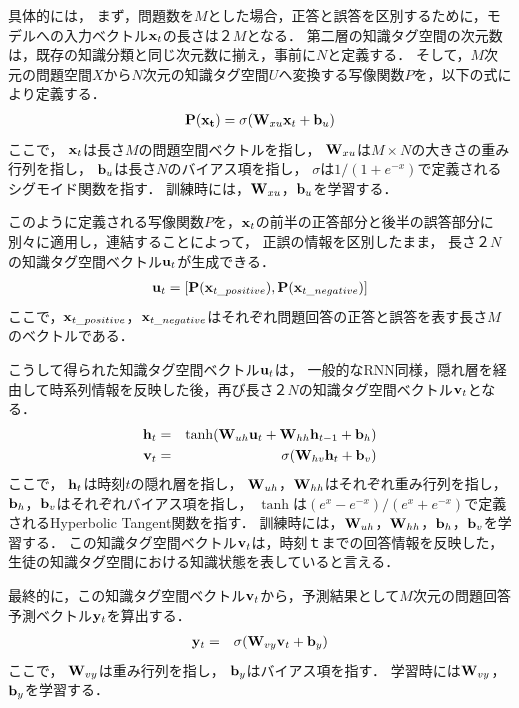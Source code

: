 具体的には，
まず，問題数を$M$とした場合，正答と誤答を区別するために，モデルへの入力ベクトル${\bf x}_t$の長さは$２M$となる．
第二層の知識タグ空間の次元数は，既存の知識分類と同じ次元数に揃え，事前に$N$と定義する．
そして，$M$次元の問題空間$X$から$N$次元の知識タグ空間$U$へ変換する写像関数$P$を，以下の式により定義する．
\begin{eqnarray}
{\bf P({\bf x}_t)} = \sigma( {\bf W}_{xu} {\bf x}_t + {\bf b}_u)
\end{eqnarray}
ここで，
${\bf x}_t$は長さ$M$の問題空間ベクトルを指し，
${\bf W}_{xu}$は$M \times N$の大きさの重み行列を指し，
${\bf b}_u$は長さ$N$のバイアス項を指し，
$\sigma$は$1 / (1 + e^{-x})$で定義されるシグモイド関数を指す．
訓練時には，${\bf W}_{xu}$，${\bf b}_u$を学習する．

このように定義される写像関数$P$を，${\bf x}_t$の前半の正答部分と後半の誤答部分に別々に適用し，連結することによって，
正誤の情報を区別したまま，
長さ$２N$の知識タグ空間ベクトル${\bf u}_t$が生成できる．
\begin{eqnarray}
{\bf u}_t = [{\bf P}({\bf x}_{t\_positive}), {\bf P}({\bf x}_{t\_negative})]
\end{eqnarray}
ここで，${\bf x}_{t\_positive}$，${\bf x}_{t\_negative}$はそれぞれ問題回答の正答と誤答を表す長さ$M$のベクトルである．

こうして得られた知識タグ空間ベクトル${\bf u}_t$は，
一般的なRNN同様，隠れ層を経由して時系列情報を反映した後，再び長さ$２N$の知識タグ空間ベクトル${\bf v}_t$となる．
\begin{eqnarray}
{\bf h}_t &=& \tanh({\bf W}_{uh} {\bf u}_t + {\bf W}_{hh}  {\bf h}_{t-1} + {\bf b}_h)\\
{\bf v}_t &=& \sigma( {\bf W}_{hv} {\bf h}_t + {\bf b}_v)
\end{eqnarray}
ここで，
${\bf h}_t$は時刻$t$の隠れ層を指し，
${\bf W}_{uh}$，${\bf W}_{hh}$はそれぞれ重み行列を指し，
${\bf b}_h$，${\bf b}_v$はそれぞれバイアス項を指し，
$\tanh$は$( e^x - e^{-x} )/( e^x + e^{-x} )$で定義されるHyperbolic Tangent関数を指す．
訓練時には，${\bf W}_{uh}$，${\bf W}_{hh}$，${\bf b}_h$，${\bf b}_v$を学習する．
この知識タグ空間ベクトル${\bf v}_t$は，時刻$ｔ$までの回答情報を反映した，生徒の知識タグ空間における知識状態を表していると言える．

最終的に，この知識タグ空間ベクトル${\bf v}_t$から，予測結果として$M$次元の問題回答予測ベクトル${\bf y}_t$を算出する．
\begin{eqnarray}
{\bf y}_t &=& \sigma( {\bf W}_{vy} {\bf v}_t + {\bf b}_y)
\end{eqnarray}
ここで，
${\bf W}_{vy}$は重み行列を指し，
${\bf b}_y$はバイアス項を指す．
学習時には${\bf W}_{vy}$，${\bf b}_y$を学習する．

